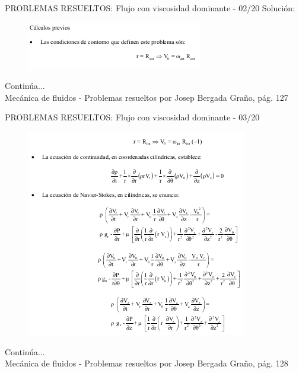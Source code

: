 \begin{frame}{PROBLEMAS RESUELTOS: Flujo con viscosidad dominante - 02/20}
\justifying
Solución:
\begin{figure}[H]
\centering
\includegraphics[scale=0.5]{Section_Files/S2-imagenes-Jhon/Book-ProbResuelts/P35-E02.png}
\end{figure}
Continúa...\\
{\tiny Mecánica de fluidos - Problemas resueltos por Josep Bergada Graño, pág. 127}
\end{frame}

\begin{frame}{PROBLEMAS RESUELTOS: Flujo con viscosidad dominante - 03/20}
\justifying
\begin{figure}[H]
\centering
\includegraphics[scale=0.5]{Section_Files/S2-imagenes-Jhon/Book-ProbResuelts/P35-E03.png}
\end{figure}
Continúa...\\
{\tiny Mecánica de fluidos - Problemas resueltos por Josep Bergada Graño, pág. 128}
\end{frame}

